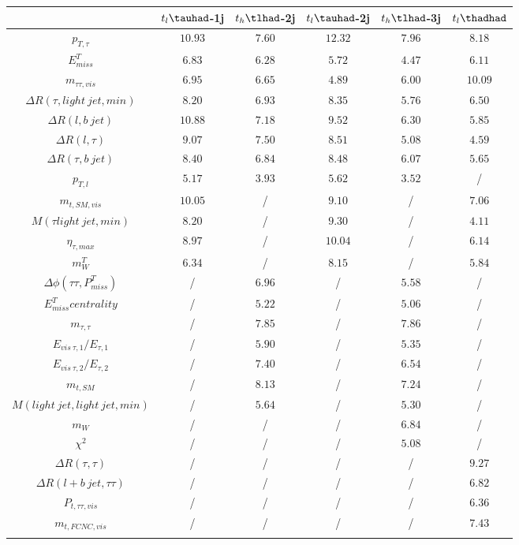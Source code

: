 \centering
\begin{tabular}{cccccc} \toprule\toprule
 & $t_{l}\tauhad$-1j & $t_{h}\tlhad$-2j & $t_{l}\tauhad$-2j & $t_{h}\tlhad$-3j & $t_l\thadhad$\\\midrule
$p_{T,\tau }$ & $10.93$ & $7.60$ & $12.32$ & $7.96$ & $8.18$\\
$E^{T}_{miss}$ & $6.83$ & $6.28$ & $5.72$ & $4.47$ & $6.11$\\
$m_{\tau \tau ,vis}$ & $6.95$ & $6.65$ & $4.89$ & $6.00$ & $10.09$\\
$\Delta R(\tau ,light~jet,min)$ & $8.20$ & $6.93$ & $8.35$ & $5.76$ & $6.50$\\
$\Delta R(l,b~jet)$ & $10.88$ & $7.18$ & $9.52$ & $6.30$ & $5.85$\\
$\Delta R(l,\tau )$ & $9.07$ & $7.50$ & $8.51$ & $5.08$ & $4.59$\\
$\Delta R(\tau ,b~jet)$ & $8.40$ & $6.84$ & $8.48$ & $6.07$ & $5.65$\\
$p_{T,l}$ & $5.17$ & $3.93$ & $5.62$ & $3.52$ &  /\\
$m_{t,SM,vis}$ & $10.05$ &  / & $9.10$ &  / & $7.06$\\
$M(\tau  light~jet,min)$ & $8.20$ &  / & $9.30$ &  / & $4.11$\\
$\eta_{\tau ,max}$ & $8.97$ &  / & $10.04$ &  / & $6.14$\\
$m^{T}_{W}$ & $6.34$ &  / & $8.15$ &  / & $5.84$\\
$\Delta\phi(\tau \tau ,P^{T}_{miss})$ &  / & $6.96$ &  / & $5.58$ &  /\\
$E^{T}_{miss} centrality$ &  / & $5.22$ &  / & $5.06$ &  /\\
$m_{\tau ,\tau }$ &  / & $7.85$ &  / & $7.86$ &  /\\
$E_{vis~\tau ,1}/E_{\tau ,1}$ &  / & $5.90$ &  / & $5.35$ &  /\\
$E_{vis~\tau ,2}/E_{\tau ,2}$ &  / & $7.40$ &  / & $6.54$ &  /\\
$m_{t,SM}$ &  / & $8.13$ &  / & $7.24$ &  /\\
$M(light~jet,light~jet,min)$ &  / & $5.64$ &  / & $5.30$ &  /\\
$m_{W}$ &  / &  / &  / & $6.84$ &  /\\
$\chi^{2}$ &  / &  / &  / & $5.08$ &  /\\
$\Delta R(\tau ,\tau )$ &  / &  / &  / &  / & $9.27$\\
$\Delta R(l+b~jet,\tau \tau )$ &  / &  / &  / &  / & $6.82$\\
$P_{t,\tau \tau ,vis}$ &  / &  / &  / &  / & $6.36$\\
$m_{t,FCNC,vis}$ &  / &  / &  / &  / & $7.43$\\
\bottomrule\bottomrule\\
\end{tabular}
